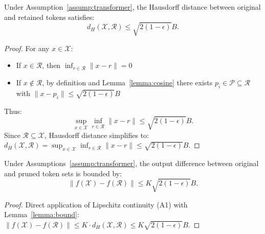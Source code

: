 \begin{lemma}\label{lemma:bound}
Under Assumption~\ref{assump:transformer}, the Hausdorff distance between original and retained tokens satisfies:
$$
d_H(\mathcal{X}, \mathcal{R}) \leq \sqrt{2(1-\epsilon)}B.
$$
\end{lemma}
\begin{proof}
For any $x \in \mathcal{X}$:
\begin{itemize}[leftmargin=10pt, topsep=0pt, itemsep=1pt, partopsep=1pt, parsep=1pt]
    \item If $x \in \mathcal{R}$, then $\inf_{r \in \mathcal{R}} \|x - r\| = 0$
    \item If $x \notin \mathcal{R}$, by definition and Lemma~\ref{lemma:cosine} there exists $p_i \in \mathcal{P} \subseteq \mathcal{R}$ with $\|x - p_i\| \leq \sqrt{2(1-\epsilon)}B$
\end{itemize}
Thus:
$$
\sup_{x \in \mathcal{X}} \inf_{r \in \mathcal{R}} \|x - r\| \leq \sqrt{2(1-\epsilon)}B.
$$
Since $\mathcal{R} \subseteq \mathcal{X}$, Hausdorff distance simplifies to:
$d_H(\mathcal{X}, \mathcal{R}) = \sup_{x \in \mathcal{X}} \inf_{r \in \mathcal{R}} \|x - r\| \leq \sqrt{2(1-\epsilon)}B.$
\end{proof}
\begin{theorem}\label{thm:main}
Under Assumptions~\ref{assump:transformer}, the output difference between original and pruned token sets is bounded by:
$$
\|f(\mathcal{X}) - f(\mathcal{R})\| \leq K\sqrt{2(1-\epsilon)}B.
$$
\end{theorem}
\begin{proof}
Direct application of Lipschitz continuity (A1) with Lemma~\ref{lemma:bound}: $\|f(\mathcal{X}) - f(\mathcal{R})\| \leq K \cdot d_H(\mathcal{X}, \mathcal{R}) \leq K\sqrt{2(1-\epsilon)}B.$
\end{proof}





